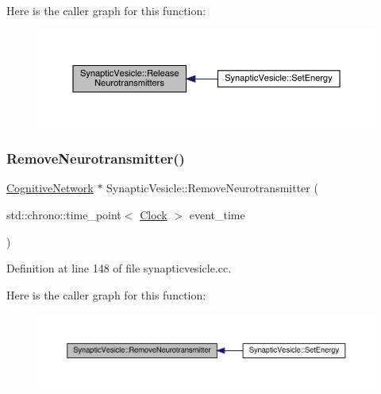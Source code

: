 Here is the caller graph for this function\+:
\nopagebreak
\begin{figure}[H]
\begin{center}
\leavevmode
\includegraphics[width=350pt]{class_synaptic_vesicle_a2509969e82fee789cc56fb0978f27662_icgraph}
\end{center}
\end{figure}
\mbox{\label{class_synaptic_vesicle_a7ea7841bd1a7a17c78a023db8860cc22}} 
\subsubsection{\texorpdfstring{Remove\+Neurotransmitter()}{RemoveNeurotransmitter()}}
{\footnotesize\ttfamily \hyperlink{class_cognitive_network}{Cognitive\+Network} $\ast$ Synaptic\+Vesicle\+::\+Remove\+Neurotransmitter (\begin{DoxyParamCaption}\item[{std\+::chrono\+::time\+\_\+point$<$ \hyperlink{universe_8h_a0ef8d951d1ca5ab3cfaf7ab4c7a6fd80}{Clock} $>$}]{event\+\_\+time }\end{DoxyParamCaption})}



Definition at line 148 of file synapticvesicle.\+cc.

Here is the caller graph for this function\+:
\nopagebreak
\begin{figure}[H]
\begin{center}
\leavevmode
\includegraphics[width=350pt]{class_synaptic_vesicle_a7ea7841bd1a7a17c78a023db8860cc22_icgraph}
\end{center}
\end{figure}
\mbox{\label{class_synaptic_vesicle_aab1e61b4910399d56071ca59f2758e72}} 
